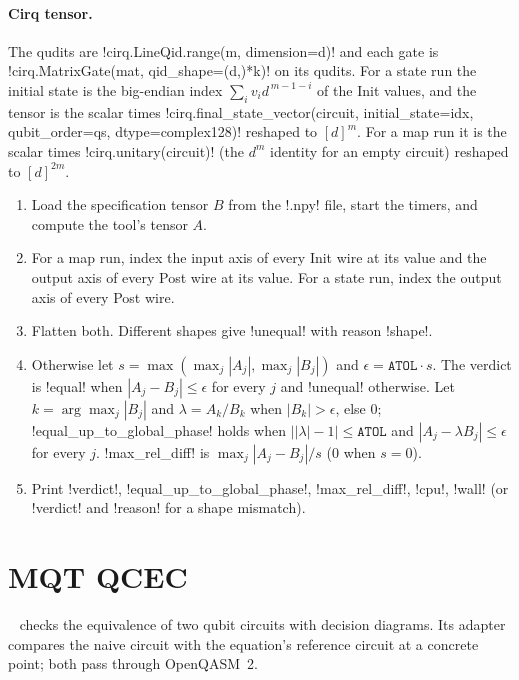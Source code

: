 \paragraph{Cirq tensor.} The qudits are \py!cirq.LineQid.range(m, dimension=d)! and each gate is \py!cirq.MatrixGate(mat, qid_shape=(d,)*k)! on its qudits. For a state run the initial state is the big-endian index $\sum_i v_id^{\,m-1-i}$ of the Init values, and the tensor is the scalar times \py!cirq.final_state_vector(circuit, initial_state=idx, qubit_order=qs, dtype=complex128)! reshaped to $[d]^m$. For a map run it is the scalar times \py!cirq.unitary(circuit)! (the $d^m$ identity for an empty circuit) reshaped to $[d]^{2m}$.

\begin{algorithm}\label{alg:bench-tools-sim}
\begin{enumerate}
\item Load the specification tensor $B$ from the \code!.npy! file, start the timers, and compute the tool's tensor $A$.
\item For a map run, index the input axis of every Init wire at its value and the output axis of every Post wire at its value. For a state run, index the output axis of every Post wire.
\item Flatten both. Different shapes give \code!unequal! with reason \code!shape!.
\item Otherwise let $s=\max(\max_j|A_j|,\max_j|B_j|)$ and $\epsilon=\mathtt{ATOL}\cdot s$. The verdict is \code!equal! when $|A_j-B_j|\leq\epsilon$ for every $j$ and \code!unequal! otherwise. Let $k=\arg\max_j|B_j|$ and $\lambda=A_k/B_k$ when $|B_k|>\epsilon$, else $0$; \code!equal_up_to_global_phase! holds when $\bigl||\lambda|-1\bigr|\leq\mathtt{ATOL}$ and $|A_j-\lambda B_j|\leq\epsilon$ for every $j$. \code!max_rel_diff! is $\max_j|A_j-B_j|/s$ ($0$ when $s=0$).
\item Print \code!verdict!, \code!equal_up_to_global_phase!, \code!max_rel_diff!, \code!cpu!, \code!wall! (or \code!verdict! and \code!reason! for a shape mismatch).
\end{enumerate}
\end{algorithm}

\section{MQT QCEC}\label{sec:bench-tools-qcec}

~\cite{burgholzer2021qcec} checks the equivalence of two qubit circuits with decision diagrams. Its adapter compares the naive circuit with the equation's reference circuit at a concrete point; both pass through OpenQASM~2.


